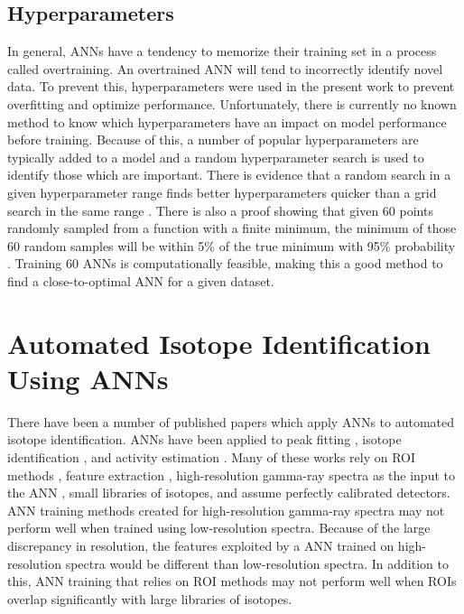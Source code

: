\documentclass[tocnosub,noragright,centerchapter,12pt,fullpage]{uiucecethesis09}
\begin{document}
\subsection{Hyperparameters}

In general, ANNs have a tendency to memorize their training set in a process called overtraining. An overtrained ANN will tend to incorrectly identify novel data. To prevent this, hyperparameters were used in the present work to prevent overfitting and optimize performance. Unfortunately, there is currently no known method to know which hyperparameters have an impact on model performance before training. Because of this, a number of popular hyperparameters are typically added to a model and a random hyperparameter search is used to identify those which are important. There is evidence that a random search in a given hyperparameter range finds better hyperparameters quicker than a grid search in the same range \cite{Bergstra2012}. There is also a proof showing that given 60 points randomly sampled from a function with a finite minimum, the minimum of those 60 random samples will be within 5\% of the true minimum with 95\% probability \cite{Zheng2015}. Training 60 ANNs is computationally feasible, making this a good method to find a close-to-optimal ANN for a given dataset. 



\section{Automated Isotope Identification Using ANNs}

There have been a number of published papers which apply ANNs to automated isotope identification. ANNs have been applied to peak fitting \cite{Abdel-Aal2002}, isotope identification \cite{Abdel-Aal1996, Medhat2012}, and activity estimation \cite{Abdel-Aal1996, Vigneron1996}. Many of these works rely on ROI methods \cite{Pilato1999}, feature extraction \cite{Chen2009}, high-resolution gamma-ray spectra as the input to the ANN \cite{Yoshida2002}, small libraries of isotopes, and assume perfectly calibrated detectors. ANN training methods created for high-resolution gamma-ray spectra may not perform well when trained using low-resolution spectra. Because of the large discrepancy in resolution, the features exploited by a ANN trained on high-resolution spectra would be different than low-resolution spectra. In addition to this, ANN training that relies on ROI methods may not perform well when ROIs overlap significantly with large libraries of isotopes.
\end{document}
